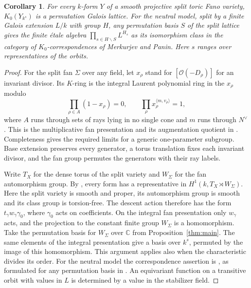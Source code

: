 \documentclass[11pt]{amsart}
\newtheorem{corollary}[theorem]{Corollary}
\theoremstyle{definition}
\newcommand{\C}{\mathbb C}
\begin{document}
\begin{corollary}\label{cor:forms}
For every $k$-form $Y$ of a smooth projective split toric Fano variety, $K_0(Y_{k^s})$ is a permutation Galois lattice. For the neutral model, split by a finite Galois extension $L/k$ with group $H$, any permutation basis $S$ of the split lattice gives the finite étale algebra $\prod_{s\in H\backslash S}L^{H_s}$ as its isomorphism class in the category of $K_0$-correspondences of Merkurjev and Panin. Here $s$ ranges over representatives of the orbits.
\end{corollary}
\begin{proof}
For the split fan $\Sigma$ over any field, let $x_\rho$ stand for $[\mathcal O(-D_\rho)]$ for an invariant divisor. Its $K$-ring is the integral Laurent polynomial ring in the $x_\rho$ modulo
\[
 \prod_{\rho\in A}(1-x_\rho)=0,\qquad
 \prod_\rho x_\rho^{\langle m,v_\rho\rangle}=1 ,
\]
where $A$ runs through sets of rays lying in no single cone and $m$ runs through $N^\vee$. This is the multiplicative fan presentation and its augmentation quotient in \cite[Theorem~6.4, \S6.3, Corollary~6.10]{VV}. Completeness gives the required limits for a generic one-parameter subgroup. Base extension preserves every generator, a torus translation fixes each invariant divisor, and the fan group permutes the generators with their ray labels.

Write $T_X$ for the dense torus of the split variety and $W_\Sigma$ for the fan automorphism group. By \cite[Lemma~4.2, Theorem~5.1]{Dun}, every form has a representative in $H^1(k,T_X\rtimes W_\Sigma)$. Here the split variety is smooth and proper, its automorphism group is smooth and its class group is torsion-free. The descent action therefore has the form $t_\gamma w_\gamma\gamma_0$, where $\gamma_0$ acts on coefficients. On the integral fan presentation only $w_\gamma$ acts, and the projection to the constant finite group $W_\Sigma$ is a homomorphism. Take the permutation basis for $W_\Sigma$ over $\C$ from Proposition~\ref{thm:main}. The same elements of the integral presentation give a basis over $k^s$, permuted by the image of this homomorphism. This argument applies also when the characteristic divides its order. For the neutral model the correspondence assertion is \cite[Proposition~4.5]{MP}, as formulated for any permutation basis in \cite[Proposition~6.1]{Xie}. An equivariant function on a transitive orbit with values in $L$ is determined by a value in the stabilizer field.
\end{proof}
\end{document}
